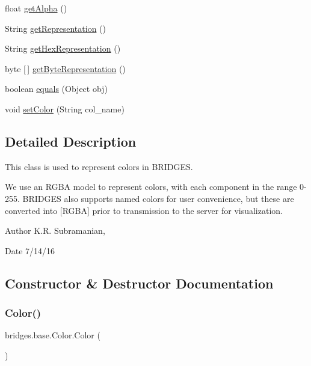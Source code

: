 \begin{DoxyCompactItemize}
\item 
float \mbox{\hyperlink{classbridges_1_1base_1_1_color_a7c4247e31ecd8fcc61ef208d5deefe68}{get\+Alpha}} ()
\item 
String \mbox{\hyperlink{classbridges_1_1base_1_1_color_a2f9b0cb588e49b2ebf2f015d4d7507d0}{get\+Representation}} ()
\item 
String \mbox{\hyperlink{classbridges_1_1base_1_1_color_aced9bc89248b85686ba5385472974fe6}{get\+Hex\+Representation}} ()
\item 
byte \mbox{[}$\,$\mbox{]} \mbox{\hyperlink{classbridges_1_1base_1_1_color_a07215c888a6d17374a3d862ff30d5f93}{get\+Byte\+Representation}} ()
\item 
boolean \mbox{\hyperlink{classbridges_1_1base_1_1_color_a81fb4cb13c05a3da2f29f48b07189e7c}{equals}} (Object obj)
\item 
void \mbox{\hyperlink{classbridges_1_1base_1_1_color_a54dcd31227bde0f5d0a4f5d3b5a24ed2}{set\+Color}} (String col\+\_\+name)
\end{DoxyCompactItemize}


\subsection{Detailed Description}
This class is used to represent colors in B\+R\+I\+D\+G\+ES. 

We use an R\+G\+BA model to represent colors, with each component in the range 0-\/255. B\+R\+I\+D\+G\+ES also supports named colors for user convenience, but these are converted into \mbox{[}R\+G\+BA\mbox{]} prior to transmission to the server for visualization.

\begin{DoxyAuthor}{Author}
K.\+R. Subramanian, 
\end{DoxyAuthor}
\begin{DoxyDate}{Date}
7/14/16 
\end{DoxyDate}


\subsection{Constructor \& Destructor Documentation}
\mbox{\label{classbridges_1_1base_1_1_color_ab6d71ac2ee1430fb2db2fbe34e692de8}} 
\subsubsection{\texorpdfstring{Color()}{Color()}\hspace{0.1cm}{\footnotesize\ttfamily [1/4]}}
{\footnotesize\ttfamily bridges.\+base.\+Color.\+Color (\begin{DoxyParamCaption}{ }\end{DoxyParamCaption})}

